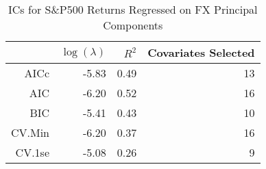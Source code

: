 \begin{table}[ht]
\centering
\begin{tabular}{rrrr}
  \hline
 & $\log(\lambda)$ & $R^2$ & Covariates Selected \\ 
  \hline
AICc & -5.83 & 0.49 &  13 \\ 
  AIC & -6.20 & 0.52 &  16 \\ 
  BIC & -5.41 & 0.43 &  10 \\ 
  CV.Min & -6.20 & 0.37 &  16 \\ 
  CV.1se & -5.08 & 0.26 &   9 \\ 
   \hline
\end{tabular}
\caption{ICs for S\&P500 Returns Regressed on FX Principal Components} 
\label{tab:spreg_ics}
\end{table}
